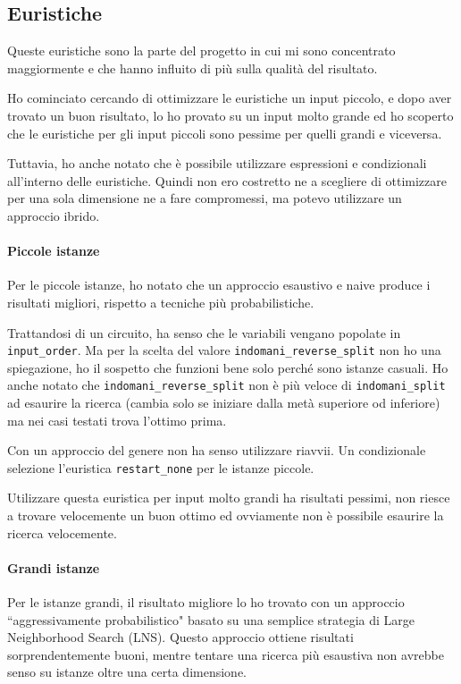 \documentclass[11pt, a4paper]{article}
\begin{document}
\subsection{Euristiche}

Queste euristiche sono la parte del progetto in cui mi sono concentrato maggiormente e che hanno influito di più sulla qualità del risultato.

Ho cominciato cercando di ottimizzare le euristiche un input piccolo, e dopo aver trovato un buon risultato, lo ho provato su un input molto grande ed ho scoperto che le euristiche per gli input piccoli sono pessime per quelli grandi e viceversa.

Tuttavia, ho anche notato che è possibile utilizzare espressioni e condizionali all'interno delle euristiche. Quindi non ero costretto ne a scegliere di ottimizzare per una sola dimensione ne a fare compromessi, ma potevo utilizzare un approccio ibrido.

\paragraph{Piccole istanze}
Per le piccole istanze, ho notato che un approccio esaustivo e naive produce i risultati migliori, rispetto a tecniche più probabilistiche.

Trattandosi di un circuito, ha senso che le variabili vengano popolate in \lstinline{input_order}. Ma per la scelta del valore \lstinline{indomani_reverse_split} non ho una spiegazione, ho il sospetto che funzioni bene solo perché sono istanze casuali.
Ho anche notato che \lstinline{indomani_reverse_split} non è più veloce di \lstinline{indomani_split} ad esaurire la ricerca (cambia solo se iniziare dalla metà superiore od inferiore) ma nei casi testati trova l'ottimo prima.

Con un approccio del genere non ha senso utilizzare riavvii. Un condizionale selezione l'euristica \lstinline{restart_none} per le istanze piccole.

Utilizzare questa euristica per input molto grandi ha risultati pessimi, non riesce a trovare velocemente un buon ottimo ed ovviamente non è possibile esaurire la ricerca velocemente.

\paragraph{Grandi istanze}
Per le istanze grandi, il risultato migliore lo ho trovato con un approccio ``aggressivamente probabilistico" basato su una semplice strategia di Large Neighborhood Search (LNS).
Questo approccio ottiene risultati sorprendentemente buoni, mentre tentare una ricerca più esaustiva non avrebbe senso su istanze oltre una certa dimensione.
\end{document}
